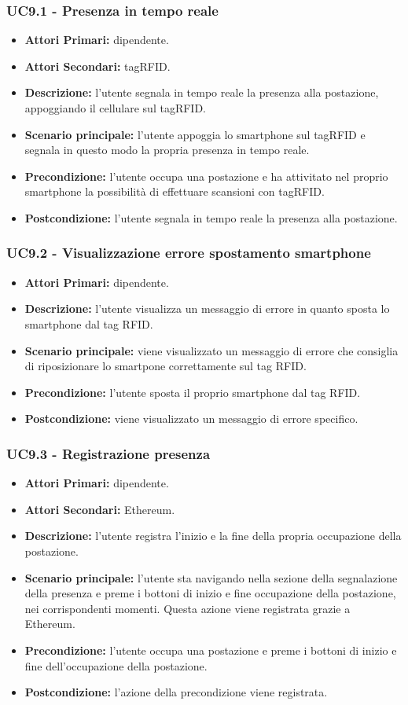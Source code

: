 \subsubsection{ UC9.1 - Presenza in tempo reale}
\begin{itemize}
	\item\textbf{Attori Primari:} dipendente.
	\item\textbf{Attori Secondari:} tagRFID.
	\item\textbf{Descrizione:} l’utente segnala in tempo reale la presenza alla postazione, appoggiando il cellulare sul tagRFID.
	\item\textbf{Scenario principale:} l’utente appoggia lo smartphone sul tagRFID e segnala in questo modo la propria presenza in tempo reale.
	\item\textbf{Precondizione:} l’utente occupa una postazione e ha attivitato nel proprio smartphone la possibilità di effettuare scansioni con tagRFID.
	\item\textbf{Postcondizione:} l’utente segnala in tempo reale la presenza alla postazione.
\end{itemize}
\subsubsection{ UC9.2 - Visualizzazione errore spostamento smartphone}
\begin{itemize}
	\item\textbf{Attori Primari:} dipendente.
	\item\textbf{Descrizione:} l’utente visualizza un messaggio di errore in quanto sposta lo smartphone dal tag RFID.
	\item\textbf{Scenario principale:} viene visualizzato un messaggio di errore che consiglia di riposizionare lo smartpone correttamente sul tag RFID.
	\item\textbf{Precondizione:} l’utente sposta il proprio smartphone dal tag RFID.
	\item\textbf{Postcondizione:} viene visualizzato un messaggio di errore specifico.
\end{itemize}
\subsubsection{ UC9.3 - Registrazione presenza}
\begin{itemize}
	\item\textbf{Attori Primari:} dipendente.
	\item\textbf{Attori Secondari:} Ethereum.
	\item\textbf{Descrizione:} l’utente registra l'inizio e la fine della propria occupazione della postazione.
	\item\textbf{Scenario principale:} l’utente sta navigando nella sezione della segnalazione della presenza e preme i bottoni di inizio e fine occupazione della postazione,
	nei corrispondenti momenti. Questa azione viene registrata grazie a Ethereum.
	\item\textbf{Precondizione:} l’utente occupa una postazione e preme i bottoni di inizio e fine dell'occupazione della postazione.
	\item\textbf{Postcondizione:} l'azione della precondizione viene registrata.
\end{itemize}
